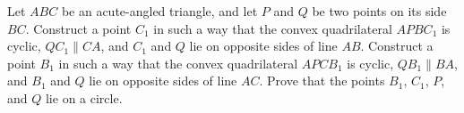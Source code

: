 Let $ABC$ be an acute-angled triangle, and let $P$ and $Q$ be two points on its side $BC$. Construct a point $C_{1}$ in such a way that the convex quadrilateral $APBC_{1}$ is cyclic, $QC_{1}\parallel CA$,  and $C_{1}$ and $Q$ lie on opposite sides of line $AB$. Construct a point $B_{1}$ in such a way that the convex quadrilateral $APCB_{1}$ is cyclic, $QB_{1}\parallel BA$,  and $B_{1}$ and $Q$ lie on opposite sides of line $AC$.  Prove that the points $B_{1}$,  $C_{1}$,  $P$,  and $Q$ lie on a circle.